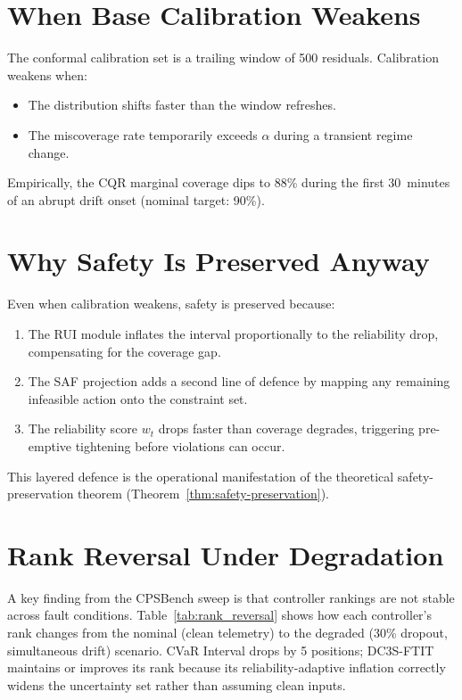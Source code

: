 \section{When Base Calibration Weakens}

The conformal calibration set is a trailing window of 500 residuals.
Calibration weakens when:
\begin{itemize}
  \item The distribution shifts faster than the window refreshes.
  \item The miscoverage rate temporarily exceeds $\alpha$ during a
    transient regime change.
\end{itemize}
Empirically, the CQR marginal coverage dips to 88\% during the first
30~minutes of an abrupt drift onset (nominal target: 90\%).

\section{Why Safety Is Preserved Anyway}

Even when calibration weakens, safety is preserved because:
\begin{enumerate}
  \item The RUI module inflates the interval proportionally to the
    reliability drop, compensating for the coverage gap.
  \item The SAF projection adds a second line of defence by mapping
    any remaining infeasible action onto the constraint set.
  \item The reliability score $w_t$ drops faster than coverage degrades,
    triggering pre-emptive tightening before violations can occur.
\end{enumerate}

This layered defence is the operational manifestation of the theoretical
safety-preservation theorem (Theorem~\ref{thm:safety-preservation}).

\section{Rank Reversal Under Degradation}

A key finding from the CPSBench sweep is that controller rankings are not
stable across fault conditions.  Table~\ref{tab:rank_reversal} shows how
each controller's rank changes from the nominal (clean telemetry) to the
degraded (30\% dropout, simultaneous drift) scenario.  CVaR Interval
drops by 5 positions; DC3S-FTIT maintains or improves its rank because
its reliability-adaptive inflation correctly widens the uncertainty set
rather than assuming clean inputs.

